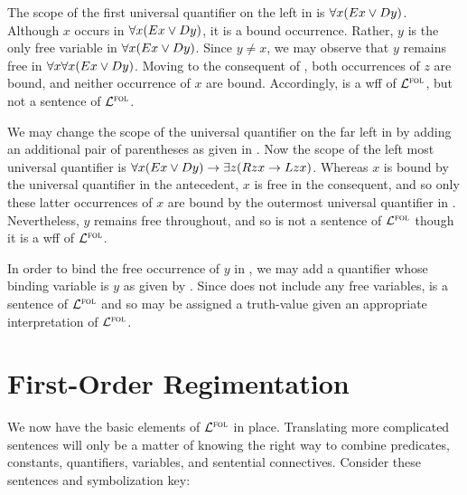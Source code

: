 \begin{earg} \label{wfswff}
\end{earg}

The scope of the first universal quantifier on the left in  is $\forall x(Ex \vee Dy)$.
Although $x$ occurs in $\forall x(Ex \vee Dy)$, it is a bound occurrence. 
Rather, $y$ is the only free variable in $\forall x(Ex \vee Dy)$.
Since $y\neq x$, we may observe that $y$ remains free in $\forall x\forall x(Ex \vee Dy)$. 
Moving to the consequent of , both occurrences of $z$ are bound, and neither occurrence of $x$ are bound.
Accordingly,  is a wff of $\mathcal{L}^{\textsc{fol}}$, but not a sentence of $\mathcal{L}^{\textsc{fol}}$.

We may change the scope of the universal quantifier on the far left in  by adding an additional pair of parentheses as given in .
Now the scope of the left most universal quantifier is $\forall x(Ex \vee Dy) \rightarrow \exists z(Rzx \rightarrow Lzx)$.
Whereas $x$ is bound by the universal quantifier in the antecedent, $x$ is free in the consequent, and so only these latter occurrences of $x$ are bound by the outermost universal quantifier in . 
Nevertheless, $y$ remains free throughout, and so  is not a sentence of $\mathcal{L}^{\textsc{fol}}$ though it is a wff of $\mathcal{L}^{\textsc{fol}}$.

In order to bind the free occurrence of $y$ in , we may add a quantifier whose binding variable is $y$ as given by .
Since  does not include any free variables,  is a sentence of $\mathcal{L}^{\textsc{fol}}$ and so may be assigned a truth-value given an appropriate interpretation of $\mathcal{L}^{\textsc{fol}}$.






\section{First-Order Regimentation}

We now have the basic elements of $\mathcal{L}^{\textsc{fol}}$ in place.
Translating more complicated sentences will only be a matter of knowing the right way to combine predicates, constants, quantifiers, variables, and sentential connectives.
Consider these sentences and symbolization key:

